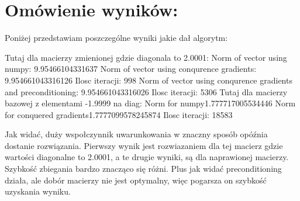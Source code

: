 \documentclass[12pt]{article}
\begin{document}
\section{Omówienie wyników:}
Poniżej przedstawiam poszczególne wyniki jakie dał algorytm:
\begin{center}
    Tutaj dla macierzy zmienionej gdzie diagonala to 2.0001:\newline\newline
    Norm of vector using numpy: 9.95466104331637\newline
    Norm of vector using conqurence gradients: 9.954661043316126\newline
    Ilosc iteracji: 998\newline
    Norm of vector using conqurence gradients and preconditioning: 9.954661043316026\newline
    Ilosc iteracji: 5306\newline\newline
    Tutaj dla macierzy bazowej z elementami -1.9999 na diag:\newline\newline
    Norm for numpy1.777717005534446\newline
    Norm for conquered gradients1.7777099578245874\newline
    Ilosc iteracji: 18583
    
\end{center}
Jak widać, duży wspołczynnik uwarunkowania w znaczny sposób opóźnia dostanie rozwiązania. Pierwszy wynik jest rozwiazaniem dla tej macierz gdzie wartości diagonalne to 2.0001, a te drugie wyniki, są dla naprawionej macierzy. Szybkość zbiegania bardzo znacząco się różni. Plus jak widać preconditioning działa, ale dobór macierzy nie jest optymalny, więc pogarsza on szybkość uzyskania wyniku.
\end{document}
